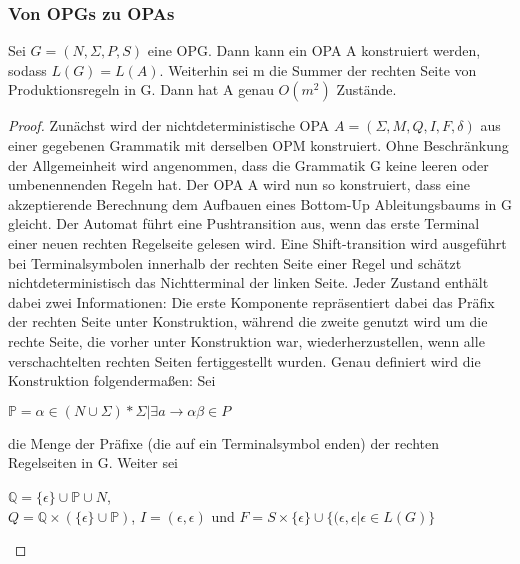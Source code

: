 \subsubsection{Von OPGs zu OPAs}
\begin{lemma}
Sei $G=(N,\Sigma, P, S)$ eine OPG. Dann kann ein OPA A konstruiert werden, sodass $L(G)=L(A)$. Weiterhin sei m die Summer der rechten Seite von Produktionsregeln in G. Dann hat A genau $O(m^2)$ Zustände.
\end{lemma}
\begin{proof}
Zunächst wird der nichtdeterministische OPA $A=(\Sigma, M, Q, I,F, \delta)$ aus einer gegebenen Grammatik mit derselben OPM konstruiert.
Ohne Beschränkung der Allgemeinheit wird angenommen, dass die Grammatik G keine leeren oder umbenennenden Regeln hat. Der OPA A wird nun so konstruiert, dass eine akzeptierende Berechnung dem Aufbauen eines Bottom-Up Ableitungsbaums in G gleicht. Der Automat führt eine Pushtransition aus, wenn das erste Terminal einer neuen rechten Regelseite gelesen wird. Eine Shift-transition  wird ausgeführt bei Terminalsymbolen innerhalb der rechten Seite einer Regel und schätzt nichtdeterministisch das Nichtterminal der linken Seite. Jeder Zustand enthält dabei zwei Informationen: Die erste Komponente repräsentiert dabei das Präfix der rechten Seite unter Konstruktion, während die zweite genutzt wird um die rechte Seite, die vorher unter Konstruktion war, wiederherzustellen, wenn alle verschachtelten rechten Seiten fertiggestellt wurden.
Genau definiert wird die Konstruktion folgendermaßen: Sei 
\begin{center}
$\mathbb{P}={\alpha\in (N\cup\Sigma)*\Sigma|\exists a\rightarrow\alpha\beta\in P}$
\end{center}
die Menge der Präfixe (die auf ein Terminalsymbol enden) der rechten Regelseiten in G. Weiter sei
\begin{center}
$\mathbb{Q}=\{\epsilon\}\cup\mathbb{P}\cup N$,\\
$Q=\mathbb{Q} \times (\{\epsilon\} \cup \mathbb{P})$, $I={(\epsilon, \epsilon)}$ und $F=S\times \{\epsilon\} \cup \{(\epsilon, \epsilon|\epsilon\in L(G)\}$
\end{center}


\end{proof}
